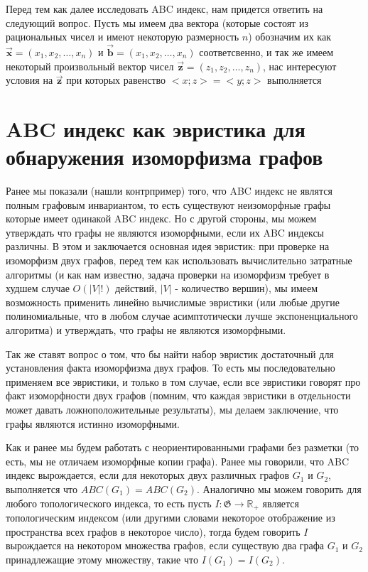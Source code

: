 \documentclass{article}
\begin{document}
Перед тем как далее исследовать ABC индекс, нам придется ответить на следующий вопрос. Пусть мы имеем два вектора (которые состоят из рациональных чисел и имеют некоторую размерность $n$) обозначим их как $\vec{\textbf{x}} = (x_1, x_2, \dots, x_n)$ и $\vec{\textbf{b}} = (x_1, x_2, \dots, x_n)$ соответсвенно, и так же имеем некоторый произвольный вектор чисел $\vec{\textbf{z}} = (z_1, z_2, \dots, z_n)$, нас интересуют условия на $\vec{\textbf{z}}$ при которых равенство $<x; z> = <y; z>$ выполняется 

\newpage


\section{ABC индекс как эвристика для обнаружения изоморфизма графов}

Ранее мы показали (нашли контрпример) того, что ABC индекс не являтся полным графовым инвариантом, то есть существуют неизоморфные графы которые имеет одинакой ABC индекс. Но с другой стороны, мы можем утверждать что графы не являются изоморфными, если их ABC индексы различны. В этом и заключается основная идея эвристик: при проверке на изоморфизм двух графов, перед тем как использовать вычислительно затратные алгоритмы (и как нам известно, задача проверки на изоморфизм требует в худшем случае $O(|V| !)$ действий, $|V|$ - количество вершин), мы имеем возможность применить линейно вычислимые эвристики (или любые другие полиномиальные, что в любом случае асимптотически лучше экспоненциального алгоритма) и утверждать, что графы не являются изоморфными.

Так же ставят вопрос о том, что бы найти набор эвристик достаточный для установления факта изоморфизма двух графов. То есть мы последовательно применяем все эвристики, и только в том случае, если все эвристики говорят про факт изоморфности двух графов (помним, что каждая эвристики в отдельности может давать 
ложноположительные результаты), мы делаем заключение, что графы являются истинно изоморфными. 

Как и ранее мы будем работать с неориентированными графами без разметки (то есть, мы не отличаем изоморфные копии графа). Ранее мы говорили, что ABC индекс вырождается, если для некоторых двух различных графов $G_1$ и $G_2$, выполняется что $ABC(G_1) = ABC(G_2)$. Аналогично мы можем говорить для любого топологического индекса, то есть пусть $I: \mathfrak{G} \rightarrow \mathbb{R_{+}}$ является топологическим индексом (или другими словами некоторое отображение из пространства всех графов в некоторое число), тогда будем говорить $I$ вырождается на некотором множества графов, если существую два графа $G_1$ и $G_2$ принадлежащие этому множеству, такие что $I(G_1) = I(G_2)$.
\end{document}
